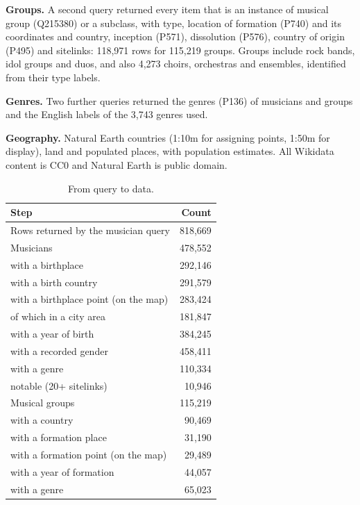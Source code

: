 \documentclass[11pt,a4paper]{article}
\begin{document}
\textbf{Groups.} A second query returned every item that is an instance of musical group (Q215380) or a subclass, with type, location of formation (P740) and its coordinates and country, inception (P571), dissolution (P576), country of origin (P495) and sitelinks: 118,971 rows for 115,219 groups. Groups include rock bands, idol groups and duos, and also 4,273 choirs, orchestras and ensembles, identified from their type labels.

\textbf{Genres.} Two further queries returned the genres (P136) of musicians and groups and the English labels of the 3,743 genres used.

\textbf{Geography.} Natural Earth \citep{naturalearth} countries (1:10m for assigning points, 1:50m for display), land and populated places, with population estimates. All Wikidata content is CC0 and Natural Earth is public domain.

\begin{table}[tbp]\centering\small\caption{From query to data.}\label{tab:pipe}\begin{tabular}{p{10.5cm}r}\toprule Step & Count\\\midrule
Rows returned by the musician query & 818,669\\
Musicians & 478,552\\
\quad with a birthplace & 292,146\\
\quad with a birth country & 291,579\\
\quad with a birthplace point (on the map) & 283,424\\
\quad\quad of which in a city area & 181,847\\
\quad with a year of birth & 384,245\\
\quad with a recorded gender & 458,411\\
\quad with a genre & 110,334\\
\quad notable (20+ sitelinks) & 10,946\\
Musical groups & 115,219\\
\quad with a country & 90,469\\
\quad with a formation place & 31,190\\
\quad with a formation point (on the map) & 29,489\\
\quad with a year of formation & 44,057\\
\quad with a genre & 65,023\\
\bottomrule\end{tabular}\end{table}
\end{document}

